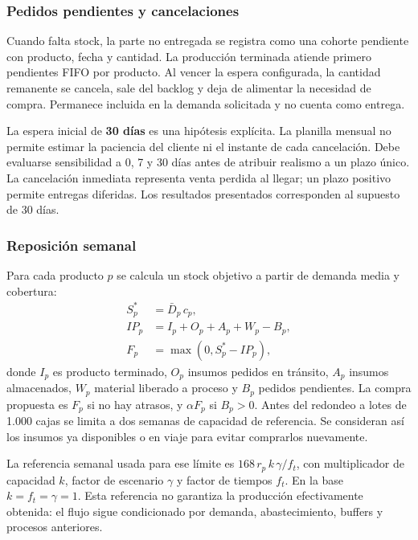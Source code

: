 \documentclass[11pt, a4paper]{article}
\begin{document}
\subsubsection{Pedidos pendientes y cancelaciones}
Cuando falta stock, la parte no entregada se registra como una cohorte pendiente con producto, fecha y cantidad. La producción terminada atiende primero pendientes FIFO por producto. Al vencer la espera configurada, la cantidad remanente se cancela, sale del backlog y deja de alimentar la necesidad de compra. Permanece incluida en la demanda solicitada y no cuenta como entrega.

La espera inicial de \textbf{30 días} es una hipótesis explícita. La planilla mensual no permite estimar la paciencia del cliente ni el instante de cada cancelación. Debe evaluarse sensibilidad a 0, 7 y 30 días antes de atribuir realismo a un plazo único. La cancelación inmediata representa venta perdida al llegar; un plazo positivo permite entregas diferidas. Los resultados presentados corresponden al supuesto de 30 días.

\subsubsection{Reposición semanal}
Para cada producto $p$ se calcula un stock objetivo a partir de demanda media y cobertura:
\begin{align}
    S_p^*&=\bar D_p\,c_p,\\
    IP_p&=I_p+O_p+A_p+W_p-B_p,\\
    F_p&=\max(0,S_p^*-IP_p),
\end{align}
donde $I_p$ es producto terminado, $O_p$ insumos pedidos en tránsito, $A_p$ insumos almacenados, $W_p$ material liberado a proceso y $B_p$ pedidos pendientes. La compra propuesta es $F_p$ si no hay atrasos, y $\alpha F_p$ si $B_p>0$. Antes del redondeo a lotes de 1.000 cajas se limita a dos semanas de capacidad de referencia. Se consideran así los insumos ya disponibles o en viaje para evitar comprarlos nuevamente.

La referencia semanal usada para ese límite es $168\,r_p\,k\,\gamma/f_t$, con multiplicador de capacidad $k$, factor de escenario $\gamma$ y factor de tiempos $f_t$. En la base $k=f_t=\gamma=1$. Esta referencia no garantiza la producción efectivamente obtenida: el flujo sigue condicionado por demanda, abastecimiento, buffers y procesos anteriores.
\end{document}
